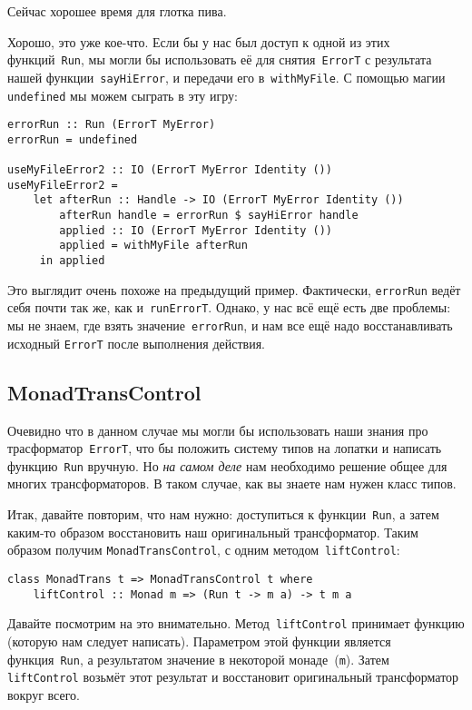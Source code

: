 \begin{remark}
Сейчас хорошее время для глотка пива.
\end{remark}

Хорошо, это уже кое-что. Если бы у нас был доступ к одной из
этих функций~\lstinline'Run', мы могли бы использовать её для
снятия~\lstinline'ErrorT' с результата нашей функции~\lstinline'sayHiError', и
передачи его в~\lstinline'withMyFile'. С помощью магии \lstinline'undefined' мы
можем сыграть в эту игру:

\begin{lstlisting}
errorRun :: Run (ErrorT MyError)
errorRun = undefined

useMyFileError2 :: IO (ErrorT MyError Identity ())
useMyFileError2 =
    let afterRun :: Handle -> IO (ErrorT MyError Identity ())
        afterRun handle = errorRun $ sayHiError handle
        applied :: IO (ErrorT MyError Identity ())
        applied = withMyFile afterRun
     in applied
\end{lstlisting}

Это выглядит очень похоже на предыдущий пример. Фактически,
\lstinline'errorRun' ведёт себя почти так же, как и~\lstinline'runErrorT'.
Однако, у нас всё ещё есть две проблемы: мы не знаем, где взять
значение~\lstinline'errorRun', и нам все ещё надо восстанавливать исходный
\lstinline'ErrorT' после выполнения действия.

\subsection{MonadTransControl}
Очевидно что в данном случае мы могли бы использовать наши знания про
трасформатор~\lstinline'ErrorT', что бы положить систему типов на лопатки и написать
функцию~\lstinline'Run' вручную. Но \emph{на самом деле} нам необходимо решение общее для многих
трансформаторов. В таком случае, как вы знаете нам нужен класс типов.

Итак, давайте повторим, что нам нужно: доступиться к функции~\lstinline'Run', а затем
каким-то образом восстановить наш оригинальный трансформатор. Таким образом
получим \lstinline'MonadTransControl', с одним методом~\lstinline'liftControl':

\begin{lstlisting}
class MonadTrans t => MonadTransControl t where
    liftControl :: Monad m => (Run t -> m a) -> t m a
\end{lstlisting}

Давайте посмотрим на это внимательно. Метод~\lstinline'liftControl' принимает функцию
(которую нам следует написать). Параметром этой функции является функция~\lstinline'Run', а
результатом значение в некоторой монаде~(\lstinline'm'). Затем \lstinline'liftControl' возьмёт этот
результат и восстановит оригинальный трансформатор вокруг всего.

